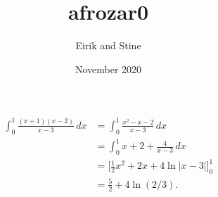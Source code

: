 \documentclass{article}
\title{afrozar0}
\author{Eirik and Stine}
\date{November 2020}
\begin{document}
\maketitle
\begin{align*}
    \int_0^1\frac{(x+1)(x-2)}{x-3}\,dx&=\int_0^1\frac{x^2-x-2}{x-3}\,dx\\
    &=\int_0^1x+2+\frac{4}{x-3}\,dx\\
    &=\bigg[\frac{1}{2}x^2+2x+4\ln|x-3|\bigg]_0^1\\
    &=\frac{5}{2}+4\ln(2/3).
\end{align*}
\end{document}
